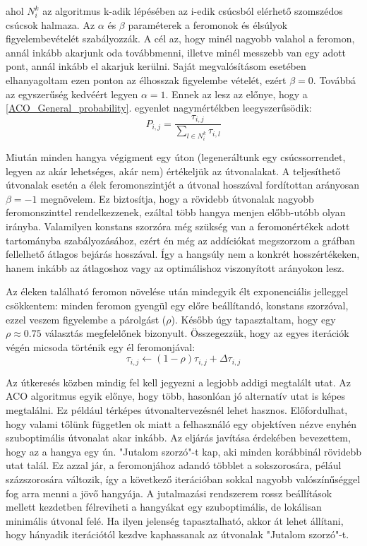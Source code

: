 ahol \(N_i^k \) az algoritmus k-adik lépésében az i-edik csúcsból elérhető szomszédos csúcsok halmaza. Az \(\alpha\) és \(\beta\) paraméterek a feromonok és élsúlyok figyelembevételét szabályozzák. A cél az, hogy minél nagyobb valahol a feromon, annál inkább akarjunk oda továbbmenni, illetve minél messzebb van egy adott pont, annál inkább el akarjuk kerülni. Saját megvalósításom esetében elhanyagoltam ezen ponton az élhosszak figyelembe vételét, ezért \(\beta = 0\). Továbbá az egyszerűség kedvéért legyen \(\alpha = 1\). Ennek az lesz az előnye, hogy a \ref{ACO_General_probability}. egyenlet nagymértékben leegyszerűsödik:
\begin{equation}
	P_{i,j} = \frac{\tau_{i,j}}{\sum_{l \in N_i^k}\tau_{i,l}}
	\label{ACO_My_probability}
\end{equation}

Miután minden hangya végigment egy úton (legeneráltunk egy csúcssorrendet, legyen az akár lehetséges, akár nem) értékeljük az útvonalakat. A teljesíthető útvonalak esetén a élek feromonszintjét a útvonal hosszával fordítottan arányosan \(\beta = -1\) megnövelem. Ez biztosítja, hogy a rövidebb útvonalak nagyobb feromonszinttel rendelkezzenek, ezáltal több hangya menjen előbb-utóbb olyan irányba. Valamilyen konstans szorzóra még szükség van a feromonértékek adott tartományba szabályozásához, ezért én még az addíciókat megszorzom a gráfban fellelhető átlagos bejárás hosszával. Így a hangsúly nem a konkrét hosszértékeken, hanem inkább az átlagoshoz vagy az optimálishoz viszonyított arányokon lesz.

Az éleken található feromon növelése után mindegyik élt exponenciális jelleggel csökkentem: minden feromon gyengül egy előre beállítandó, konstans szorzóval, ezzel veszem figyelembe a párolgást (\(\rho\)). Később úgy tapasztaltam, hogy egy \(\rho \approx 0.75\) választás megfelelőnek bizonyult. Összegezzük, hogy az egyes iterációk végén micsoda történik egy él feromonjával:
\[ \tau_{i,j} \leftarrow (1-\rho)\tau_{i,j} + \Delta\tau_{i,j} \]

Az útkeresés közben mindig fel kell jegyezni a legjobb addigi megtalált utat. Az ACO algoritmus egyik előnye, hogy több, hasonlóan jó alternatív utat is képes megtalálni. Ez például térképes útvonaltervezésnél lehet hasznos. Előfordulhat, hogy valami tőlünk független ok miatt a felhasználó egy objektíven nézve enyhén szuboptimális útvonalat akar inkább. Az eljárás javítása érdekében bevezettem, hogy az a hangya egy ún. "Jutalom szorzó"-t kap, aki minden korábbinál rövidebb utat talál. Ez azzal jár, a feromonjához adandó többlet a sokszorosára, pélául százszorosára változik, így a következő iterációban sokkal nagyobb valószínűséggel fog arra menni a jövő hangyája. A jutalmazási rendszerem rossz beállítások mellett kezdetben félreviheti a hangyákat egy szuboptimális, de lokálisan minimális útvonal felé. Ha ilyen jelenség tapasztalható, akkor át lehet állítani, hogy hányadik iterációtól kezdve kaphassanak az útvonalak "Jutalom szorzó"-t.

